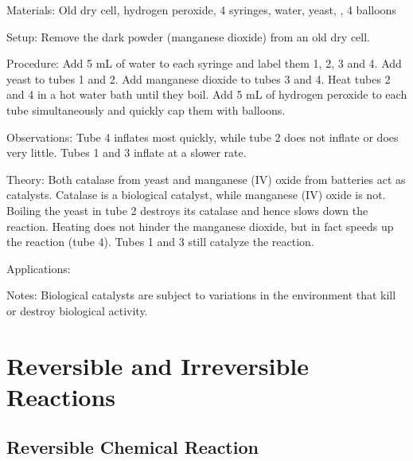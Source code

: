 \begin{multicols}{2}
\begin{description*}
\item[Materials:]{Old dry cell, hydrogen peroxide, 4 syringes, water, yeast, , 4 balloons}
\item[Setup:]{Remove the dark powder (manganese dioxide) from an old dry cell.}
\item[Procedure:]{Add 5 mL of water to each syringe and label them 1, 2, 3 and 4. Add yeast to tubes 1 and 2. Add manganese dioxide to tubes 3 and 4. Heat tubes 2 and 4 in a hot water bath until they boil. Add 5 mL of hydrogen peroxide to each tube simultaneously and quickly cap them with balloons.}
\item[Observations:]{Tube 4 inflates most quickly, while tube 2 does not inflate or does very little. Tubes 1 and 3 inflate at a slower rate.}
\item[Theory:]{Both catalase from yeast and manganese (IV) oxide from batteries act as catalysts. Catalase is a biological catalyst, while manganese (IV) oxide is not. Boiling the yeast in tube 2 destroys its catalase and hence slows down the reaction. Heating does not hinder the manganese dioxide, but in fact speeds up the reaction (tube 4). Tubes 1 and 3 still catalyze the reaction. }
\item[Applications:]{}
\item[Notes:]{Biological catalysts are subject to variations in the environment that kill or destroy biological activity.}
\end{description*}


\section*{Reversible and Irreversible \hfill \\ Reactions}


\subsection{Reversible Chemical Reaction}



\end{multicols}
